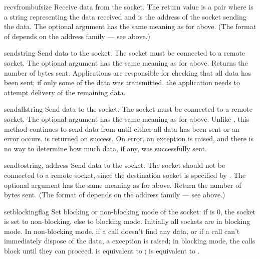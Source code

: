 \begin{methoddesc}[socket]{recvfrom}{bufsize}
Receive data from the socket.  The return value is a pair
 where  is a string
representing the data received and  is the address of the
socket sending the data.  The optional  argument has the
same meaning as for  above.
(The format of  depends on the address family --- see above.)
\end{methoddesc}

\begin{methoddesc}[socket]{send}{string}
Send data to the socket.  The socket must be connected to a remote
socket.  The optional  argument has the same meaning as for
 above.  Returns the number of bytes sent.
Applications are responsible for checking that all data has been sent;
if only some of the data was transmitted, the application needs to
attempt delivery of the remaining data.
\end{methoddesc}

\begin{methoddesc}[socket]{sendall}{string}
Send data to the socket.  The socket must be connected to a remote
socket.  The optional  argument has the same meaning as for
 above.  Unlike , this method continues
to send data from  until either all data has been sent or
an error occurs.   is returned on success.  On error, an
exception is raised, and there is no way to determine how much data,
if any, was successfully sent.
\end{methoddesc}

\begin{methoddesc}[socket]{sendto}{string, address}
Send data to the socket.  The socket should not be connected to a
remote socket, since the destination socket is specified by
.  The optional  argument has the same
meaning as for  above.  Return the number of bytes sent.
(The format of  depends on the address family --- see above.)
\end{methoddesc}

\begin{methoddesc}[socket]{setblocking}{flag}
Set blocking or non-blocking mode of the socket: if  is 0,
the socket is set to non-blocking, else to blocking mode.  Initially
all sockets are in blocking mode.  In non-blocking mode, if a
 call doesn't find any data, or if a
 call can't immediately dispose of the data, a
 exception is raised; in blocking mode, the calls
block until they can proceed.
 is equivalent to ;
 is equivalent to .
\end{methoddesc}

